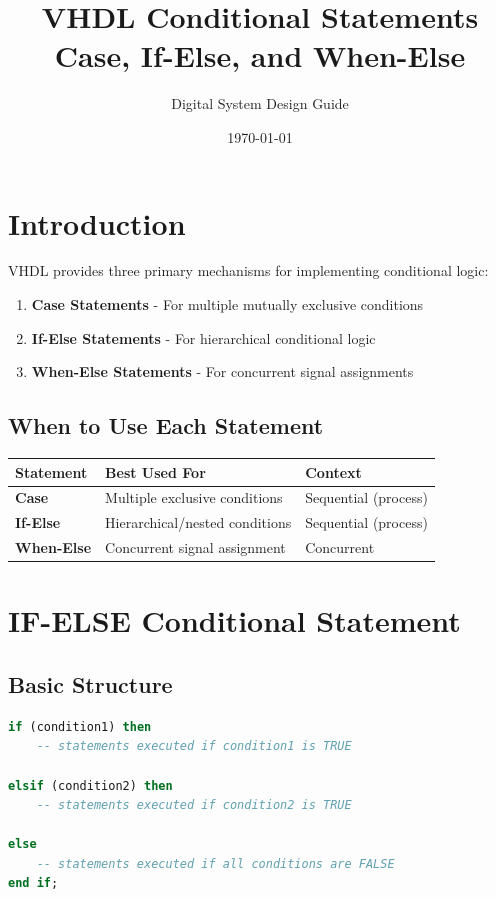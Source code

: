 \documentclass[12pt,a4paper]{article}
\title{\textbf{VHDL Conditional Statements}\\
        \normalsize Case, If-Else, and When-Else}
\author{Digital System Design Guide}
\date{\today}
\begin{document}
\maketitle
\tableofcontents
\newpage

\section{Introduction}

VHDL provides three primary mechanisms for implementing conditional logic:
\begin{enumerate}
    \item \textbf{Case Statements} - For multiple mutually exclusive conditions
    \item \textbf{If-Else Statements} - For hierarchical conditional logic
    \item \textbf{When-Else Statements} - For concurrent signal assignments
\end{enumerate}

\subsection{When to Use Each Statement}

\begin{table}[h]
\centering
\begin{tabular}{|l|p{4cm}|p{4cm}|}
\hline
\textbf{Statement} & \textbf{Best Used For} & \textbf{Context} \\
\hline
\textbf{Case} & Multiple exclusive conditions & Sequential (process) \\
\hline
\textbf{If-Else} & Hierarchical/nested conditions & Sequential (process) \\
\hline
\textbf{When-Else} & Concurrent signal assignment & Concurrent \\
\hline
\end{tabular}
\end{table}

\newpage
\section{IF-ELSE Conditional Statement}

\subsection{Basic Structure}

\begin{lstlisting}[language=VHDL]
if (condition1) then
    -- statements executed if condition1 is TRUE
    
elsif (condition2) then
    -- statements executed if condition2 is TRUE
    
else
    -- statements executed if all conditions are FALSE
end if;
\end{lstlisting}
\end{document}
